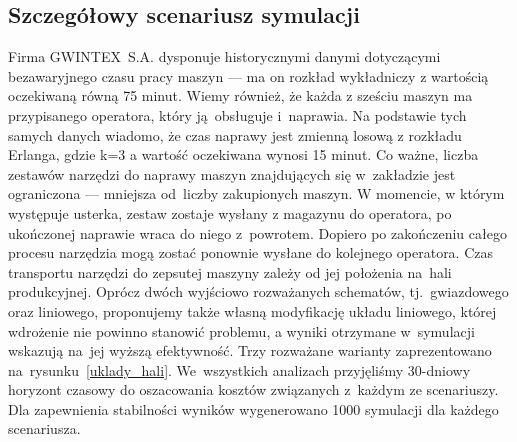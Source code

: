 \documentclass[12pt, a4paper, oneside]{mwart} %
\begin{document}
\subsection{Szczegółowy scenariusz symulacji}

Firma GWINTEX~S.A. dysponuje historycznymi danymi dotyczącymi bezawaryjnego czasu pracy maszyn --- ma on rozkład wykładniczy z wartością oczekiwaną równą 75 minut. Wiemy również, że każda z sześciu maszyn ma przypisanego operatora, który ją~obsługuje i~naprawia. Na podstawie tych samych danych wiadomo, że czas naprawy jest zmienną losową z rozkładu Erlanga, gdzie k=3 a wartość oczekiwana wynosi 15 minut. Co ważne, liczba zestawów narzędzi do naprawy maszyn znajdujących się w~zakładzie jest ograniczona --- mniejsza od~liczby zakupionych maszyn. W momencie, w którym występuje usterka, zestaw zostaje wysłany z magazynu do operatora, po ukończonej naprawie wraca do niego z~powrotem. Dopiero po zakończeniu całego procesu narzędzia mogą zostać ponownie wysłane do kolejnego operatora. Czas transportu narzędzi do zepsutej maszyny zależy od jej położenia na~hali produkcyjnej. Oprócz dwóch wyjściowo rozważanych schematów, tj.~gwiazdowego oraz liniowego, proponujemy także własną modyfikację układu liniowego, której wdrożenie nie powinno stanowić problemu, a wyniki otrzymane w~symulacji wskazują na~jej wyższą efektywność. Trzy rozważane warianty zaprezentowano na~rysunku~\ref{uklady_hali}. We~wszystkich analizach przyjęliśmy 30-dniowy horyzont czasowy do oszacowania kosztów związanych z~każdym ze scenariuszy. Dla zapewnienia stabilności wyników wygenerowano 1000 symulacji dla każdego scenariusza.
\end{document}
